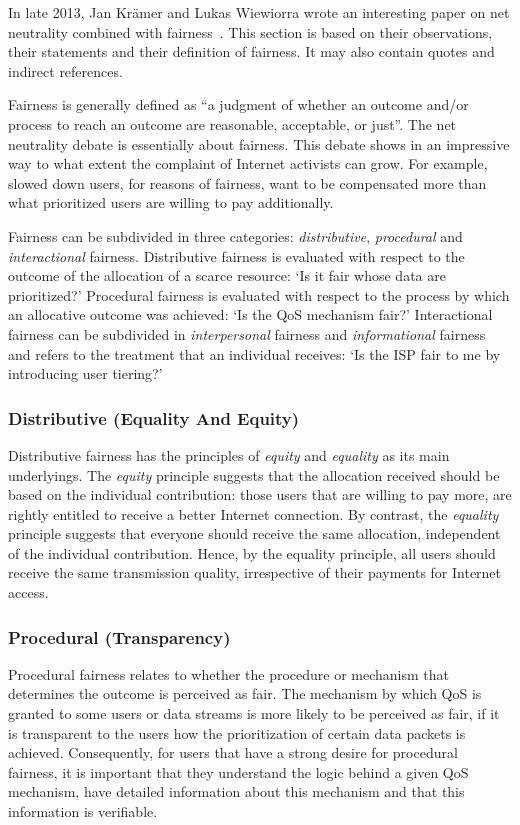 
In late 2013, Jan Kr\"{a}mer and Lukas Wiewiorra wrote an interesting paper on net neutrality combined with fairness~\cite{kramer2013fair}. This section is based on their observations, their statements and their definition of fairness. It may also contain quotes and indirect references.

Fairness is generally defined as ``a judgment of whether an outcome and/or process to reach an outcome are reasonable, acceptable, or just''. The net neutrality debate is essentially about fairness. This debate shows in an impressive way to what extent the complaint of Internet activists can grow. For example, slowed down users, for reasons of fairness, want to be compensated more than what prioritized users are willing to pay additionally.

Fairness can be subdivided in three categories: \emph{distributive}, \emph{procedural} and \emph{interactional} fairness. Distributive fairness is evaluated with respect to the outcome of the allocation of a scarce resource: `Is it fair whose data are prioritized?' Procedural fairness is evaluated with respect to the process by which an allocative outcome was achieved: `Is the \ac{QoS} mechanism fair?' Interactional fairness can be subdivided in \emph{interpersonal} fairness and \emph{informational} fairness and refers to the treatment that an individual receives: `Is the \ac{ISP} fair to me by introducing user tiering?'

\subsubsection{Distributive (Equality And Equity)}
Distributive fairness has the principles of \emph{equity} and \emph{equality} as its main underlyings.
The \emph{equity} principle suggests that the allocation received should be based on the individual contribution: those users that are willing to pay more, are rightly entitled to receive a better Internet connection.
By contrast, the \emph{equality} principle suggests that everyone should receive the same allocation, independent of the individual contribution. Hence, by the equality principle, all users should receive the same transmission quality, irrespective of their payments for Internet access.

\subsubsection{Procedural (Transparency)}
Procedural fairness relates to whether the procedure or mechanism that determines the outcome is perceived as fair.
The mechanism by which \ac{QoS} is granted to some users or data streams is more likely to be perceived as fair, if it is transparent to the users how the prioritization of certain data packets is achieved. Consequently, for users that have a strong desire for procedural fairness, it is important that they understand the logic behind a given \ac{QoS} mechanism, have detailed information about this mechanism and that this information is verifiable.

